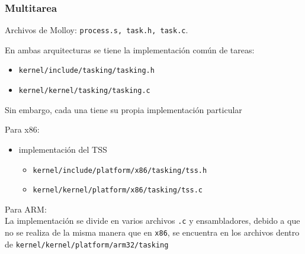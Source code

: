 	
	\subsubsection{Multitarea}
		Archivos de Molloy: \texttt{process.s, task.h, task.c}.
		
		En ambas arquitecturas se tiene la implementación común de tareas:
		\begin{itemize} \setlength\itemsep{0pt}
			\item \texttt{kernel/include/tasking/tasking.h}
			\item \texttt{kernel/kernel/tasking/tasking.c}
		\end{itemize}
	
		Sin embargo, cada una tiene su propia implementación particular
		
		Para x86:
		\begin{itemize} \setlength\itemsep{0pt}
			\item implementación del TSS
			\begin{itemize} \setlength\itemsep{0pt}
				\item \texttt{kernel/include/platform/x86/tasking/tss.h}
				\item \texttt{kernel/kernel/platform/x86/tasking/tss.c}
			\end{itemize}
		\end{itemize}
		
		Para ARM:\\
		La implementación se divide en varios archivos \texttt{.c} y ensambladores, debido a que no se realiza de la misma manera que en \texttt{x86}, se encuentra en los archivos dentro de
		\texttt{kernel/kernel/platform/arm32/tasking}
		
